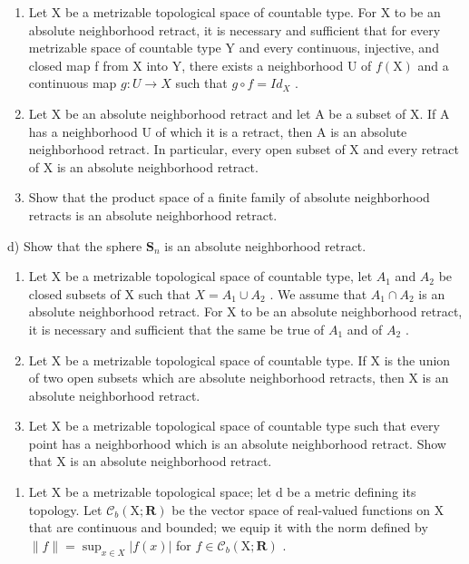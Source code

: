 \begin{enumerate}
\def\labelenumi{\alph{enumi})}
\item
  Let X be a metrizable topological space of countable type. For X to be an absolute neighborhood retract, it is necessary and sufficient that for every metrizable space of countable type Y and every continuous, injective, and closed map f from X into Y, there exists a neighborhood U of \(f(\mathrm{X})\) and a continuous map \(g: U \to X\) such that \(g \circ f = Id_{X}\) .
\item
  Let X be an absolute neighborhood retract and let A be a subset of X. If A has a neighborhood U of which it is a retract, then A is an absolute neighborhood retract. In particular, every open subset of X and every retract of X is an absolute neighborhood retract.
\item
  Show that the product space of a finite family of absolute neighborhood retracts is an absolute neighborhood retract.
\end{enumerate}

d) Show that the sphere \(\mathbf{S}_n\) is an absolute neighborhood retract.

\begin{enumerate}
\def\labelenumi{\alph{enumi})}
\setcounter{enumi}{4}
\item
  Let X be a metrizable topological space of countable type, let \(A_{1}\) and \(A_{2}\) be closed subsets of X such that \(X = A_{1} \cup A_{2}\) . We assume that \(A_{1} \cap A_{2}\) is an absolute neighborhood retract. For X to be an absolute neighborhood retract, it is necessary and sufficient that the same be true of \(A_{1}\) and of \(A_{2}\) .
\item
  Let X be a metrizable topological space of countable type. If X is the union of two open subsets which are absolute neighborhood retracts, then X is an absolute neighborhood retract.
\item
  Let X be a metrizable topological space of countable type such that every point has a neighborhood which is an absolute neighborhood retract. Show that X is an absolute neighborhood retract.
\end{enumerate}

\begin{enumerate}
\def\labelenumi{\arabic{enumi})}
\setcounter{enumi}{7}
\tightlist
\item
  Let X be a metrizable topological space; let d be a metric defining its topology. Let \(\mathcal{C}_{b}(\mathrm{X};\mathbf{R})\) be the vector space of real-valued functions on X that are continuous and bounded; we equip it with the norm defined by \(\|f\| = \sup_{x \in X} |f(x)|\) for \(f \in \mathcal{C}_{b}(\mathrm{X};\mathbf{R})\) .
\end{enumerate}

